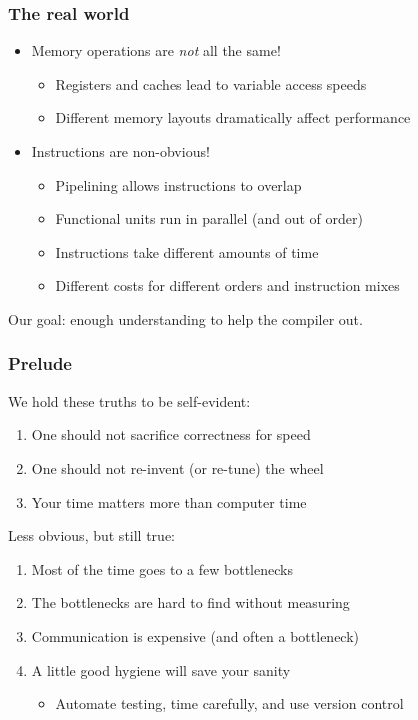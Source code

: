 \documentclass{beamer}
\begin{document}
\begin{frame}
  \frametitle{The real world}

  \begin{center}
  \end{center}

  \begin{itemize}
  \item Memory operations are {\em not} all the same!
    \begin{itemize}
    \item Registers and caches lead to variable access speeds
    \item Different memory layouts dramatically affect performance
    \end{itemize}
  \item Instructions are non-obvious!
    \begin{itemize}
    \item Pipelining allows instructions to overlap
    \item Functional units run in parallel (and out of order)
    \item Instructions take different amounts of time
    \item Different costs for different orders and instruction mixes
    \end{itemize}
  \end{itemize}

  Our goal: enough understanding to help the compiler out.
\end{frame}

\begin{frame}
  \frametitle{Prelude}

  We hold these truths to be self-evident:
  \begin{enumerate}
  \item One should not sacrifice correctness for speed
  \item One should not re-invent (or re-tune) the wheel
  \item Your time matters more than computer time
  \end{enumerate}
  
  Less obvious, but still true:
  \begin{enumerate}
  \item Most of the time goes to a few bottlenecks
  \item The bottlenecks are hard to find without measuring
  \item Communication is expensive (and often a bottleneck)
  \item A little good hygiene will save your sanity
    \begin{itemize}
    \item Automate testing, time carefully, and use version control
    \end{itemize}
  \end{enumerate}
\end{frame}
\end{document}
